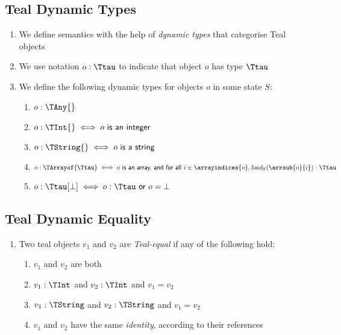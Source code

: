 \subsection{Teal Dynamic Types}
\begin{enumerate}
\item We define semantics with the help of \emph{dynamic types} that categorise Teal objects
\item We use notation $o : \Ttau$ to indicate that object $o$ has type $\Ttau$
\item We define the following dynamic types for objects $o$ in some state $S$:
  \begin{enumerate}
    \item $o : \TAny{}$
    \item $o : \TInt{} \iff o \textsf{ is an integer}$
    \item $o : \TString{} \iff o \textsf{ is a string}$
    \item $o : \TArrayof{\Ttau} \iff o \textsf{ is an array, and for all }i \in \arrayindices{o}, \textit{load}_S(\arrsub{o}{i}) : \Ttau$
    \item $o : \Ttau[\bot] \iff o : \Ttau \textsf{ or } o = \bot$
  \end{enumerate}
\end{enumerate}

\subsection{Teal Dynamic Equality}
\begin{enumerate}
\item Two teal objects $v_1$ and $v_2$ are \emph{Teal-equal} if any of the following hold:
  \begin{enumerate}
    \item $v_1$ and $v_2$ are both \Vnull
    \item $v_1 : \TInt$ and $v_2 : \TInt$ and $v_1 = v_2$
    \item $v_1 : \TString$ and $v_2 : \TString$ and $v_1 = v_2$
    \item $v_1$ and $v_2$ have the same \emph{identity}, according to their references
  \end{enumerate}
\end{enumerate}

